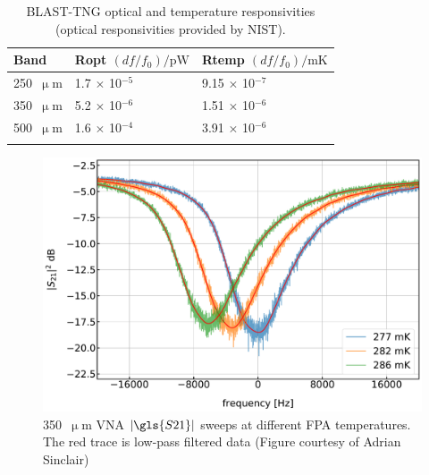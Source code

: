 \begin{table}[!htbp]
\centering
\begin{tabular}{@{}lll@{}}
\dtoprule{}
Band & \gls{Ropt} $(df/f_{0})/\mathrm{pW}$     & \gls{Rtemp} $(df/f_{0})/\mathrm{mK}$ \\ \midrule
250~$\upmu$m & 1.7 $\times$ 10$^{-5}$ & 9.15 $\times$ 10$^{-7}$ \\
350~$\upmu$m & 5.2 $\times$ 10$^{-6}$ & 1.51 $\times$ 10$^{-6}$ \\
500~$\upmu$m & 1.6 $\times$ 10$^{-4}$ & 3.91 $\times$ 10$^{-6}$ \\ \dbottomrule{}
\\
\end{tabular}
\caption[~BLAST-TNG optical and temperature responsivities.]{BLAST-TNG optical and temperature responsivities (optical responsivities provided by NIST).}
\label{table:responsivities}
\end{table}

\begin{figure}[!htbp]
\centering
\includegraphics[width=\textwidth]{figures/blast_data/sweeps/temp_sweep_pal}
\caption[~350  VNA sweeps at different FPA temperatures.]{350~$\upmu$m VNA $|\gls{S21}|$ sweeps at different FPA temperatures. The red trace is low-pass filtered data (Figure courtesy of Adrian Sinclair)}
\label{fig:temp sweeps}
\end{figure}

